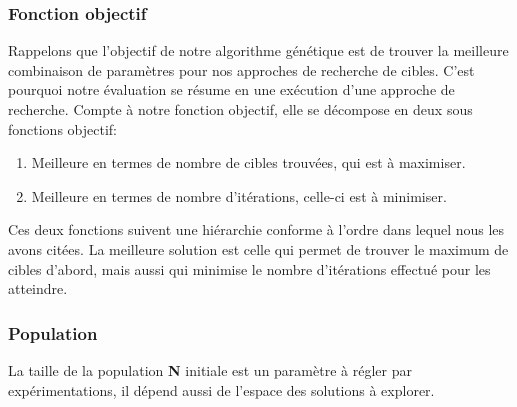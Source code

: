\subsubsection{Fonction objectif}
Rappelons que l’objectif de notre algorithme génétique est de trouver la meilleure combinaison de paramètres pour nos approches de recherche de cibles. C’est pourquoi notre évaluation se résume en une exécution d’une approche de recherche. Compte à notre fonction objectif, elle se décompose en deux sous fonctions objectif:
\begin{enumerate}
	\item Meilleure en termes de nombre de cibles trouvées, qui est à maximiser.
	\item Meilleure en termes de nombre d'itérations, celle-ci est à minimiser.
\end{enumerate}

Ces deux fonctions suivent une hiérarchie conforme à l’ordre dans lequel nous les avons citées. La meilleure solution est celle qui permet de trouver le maximum de cibles d’abord, mais aussi qui minimise le nombre d’itérations effectué pour les atteindre.

\subsubsection{Population}
La taille de la population \textbf{N} initiale est un paramètre à régler par expérimentations, il dépend aussi de l'espace des solutions à explorer.

